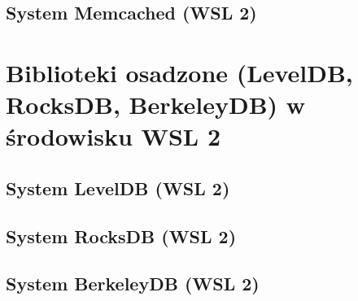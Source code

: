 \subsection{System Memcached (WSL 2)}





\clearpage

\section{Biblioteki osadzone (LevelDB, RocksDB, BerkeleyDB) w środowisku WSL 2}

\subsection{System LevelDB (WSL 2)}





\clearpage

\subsection{System RocksDB (WSL 2)}





\clearpage

\subsection{System BerkeleyDB (WSL 2)}





\clearpage

